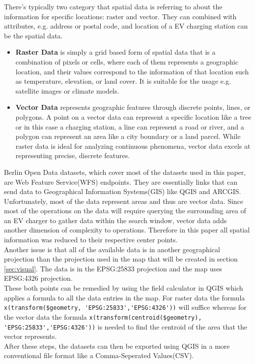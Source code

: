 There's typically two category that spatial data is referring to about the information for specific locations: raster and vector. They can combined with attributes, e.g. address or postal code, and location of a EV charging station can be the spatial data.
\begin{itemize}
    \item \textbf{Raster Data} is simply a grid based form of spatial data that is a combination of pixels or cells, where each of them represents a geographic location, and their values correspond to the information of that location such as temperature, elevation, or land cover. It is suitable for the usage e.g. satellite images or climate models. 
    \item \textbf{Vector Data} represents geographic features through discrete points, lines, or polygons. A point on a vector data can represent a specific location like a tree or in this case a  charging station, a line can represent a road or river, and a polygon can represent an area like a city boundary or a land parcel. While raster data is ideal for analyzing continuous phenomena, vector data excels at representing precise, discrete features.
\end{itemize}

Berlin Open Data datasets, which cover most of the datasets used in this paper, are Web Feature Service(WFS) endpoints. They are essentially links that can send data to Geographical Information Systems(\gls{GIS}) like QGIS and ARCGIS. Unfortunately, most of the data represent areas and thus are vector data. Since most of the operations on the data will require querying the surrounding area of an EV charger to gather data within the search window, vector data adds another dimension of complexity to operations. Therefore in this paper all spatial information was reduced to their respective center points.\\
Another issue is that all of the available data is in another geographical projection than the projection used in the map that will be created in section \ref{sec:visual}. The data is in the EPSG:25833 projection and the map uses EPSG:4326 projection.\\
These both points can be remedied by using the field calculator in QGIS which applies a formula to all the data entries in the map. For raster data the formula \verb|x(transform($geometry, 'EPSG:25833','EPSG:4326'))| will suffice whereas for the vector data the formula \verb|x(transform(centroid($geometry), 'EPSG:25833','EPSG:4326'))| is needed to find the centroid of the area that the vector represents.\\
After these steps, the datasets can then be exported using QGIS in a more conventional file format like a Comma-Seperated Values(\gls{CSV}).
